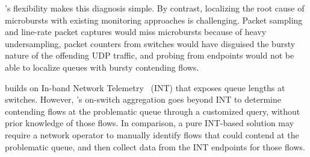 \TheSystem's flexibility makes this diagnosis simple.
%
By contrast, localizing the root cause of microbursts with existing monitoring
approaches is challenging.
%
Packet sampling and
line-rate packet captures would miss microbursts because of heavy undersampling,
packet counters from switches would have disguised the bursty nature of the
offending UDP traffic, and probing from endpoints would not be able to
localize queues with bursty contending flows.

\TheSystem builds on In-band Network Telemetry~\cite{int, barefoot-demo} (INT)
that exposes queue lengths at switches. However, \TheSystem's on-switch
aggregation goes beyond INT to determine contending flows at the problematic
queue through a customized query, without prior knowledge of those flows.
%
In comparison, a pure INT-based solution may require a network operator to
manually identify flows that could contend at the problematic queue, and then collect data
from the INT endpoints for those flows.
